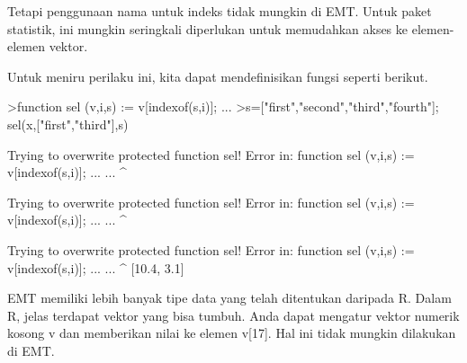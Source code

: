 \documentclass[12pt,arial,letterpaper]{book}
\begin{document}
\begin{eulercomment}
\begin{eulercomment}
\begin{eulercomment}
\begin{eulercomment}
\begin{eulercomment}
\begin{eulercomment}
\begin{eulercomment}
\begin{eulercomment}
\begin{eulercomment}
\begin{eulercomment}
\begin{eulercomment}
\begin{eulercomment}
\begin{eulercomment}
\begin{eulercomment}
\begin{eulercomment}
\begin{eulercomment}
\begin{eulercomment}
\begin{eulercomment}
\begin{eulercomment}
\begin{eulercomment}
\begin{eulercomment}
\begin{eulercomment}
\begin{eulercomment}
\begin{eulercomment}
\begin{eulercomment}
\begin{eulercomment}
\begin{eulercomment}
\begin{eulercomment}
\begin{eulercomment}
\begin{eulercomment}
\begin{eulercomment}
\begin{eulercomment}
\begin{eulercomment}
\begin{eulercomment}
\begin{eulercomment}
\begin{eulercomment}
\begin{euleroutput}
  [10.4,  5.6,  5.6,  10.4]
\end{euleroutput}
\begin{eulercomment}
Tetapi penggunaan nama untuk indeks tidak mungkin di EMT. Untuk paket
statistik, ini mungkin seringkali diperlukan untuk memudahkan akses ke
elemen-elemen vektor.

Untuk meniru perilaku ini, kita dapat mendefinisikan fungsi seperti
berikut.
\end{eulercomment}
\begin{eulerprompt}
>function sel (v,i,s) := v[indexof(s,i)]; ...
>s=["first","second","third","fourth"]; sel(x,["first","third"],s)
\end{eulerprompt}
\begin{euleroutput}
  
  Trying to overwrite protected function sel!
  Error in:
  function sel (v,i,s) := v[indexof(s,i)]; ... ...
               ^
  
  Trying to overwrite protected function sel!
  Error in:
  function sel (v,i,s) := v[indexof(s,i)]; ... ...
               ^
  
  Trying to overwrite protected function sel!
  Error in:
  function sel (v,i,s) := v[indexof(s,i)]; ... ...
               ^
  [10.4,  3.1]
\end{euleroutput}
\begin{eulercomment}
EMT memiliki lebih banyak tipe data yang telah ditentukan daripada R.
Dalam R, jelas terdapat vektor yang bisa tumbuh. Anda dapat mengatur
vektor numerik kosong v dan memberikan nilai ke elemen v[17]. Hal ini
tidak mungkin dilakukan di EMT.


\end{eulercomment}
\end{eulercomment}
\end{eulercomment}
\end{eulercomment}
\end{eulercomment}
\end{eulercomment}
\end{eulercomment}
\end{eulercomment}
\end{eulercomment}
\end{eulercomment}
\end{eulercomment}
\end{eulercomment}
\end{eulercomment}
\end{eulercomment}
\end{eulercomment}
\end{eulercomment}
\end{eulercomment}
\end{eulercomment}
\end{eulercomment}
\end{eulercomment}
\end{eulercomment}
\end{eulercomment}
\end{eulercomment}
\end{eulercomment}
\end{eulercomment}
\end{eulercomment}
\end{eulercomment}
\end{eulercomment}
\end{eulercomment}
\end{eulercomment}
\end{eulercomment}
\end{eulercomment}
\end{eulercomment}
\end{eulercomment}
\end{eulercomment}
\end{eulercomment}
\end{eulercomment}
\end{document}
